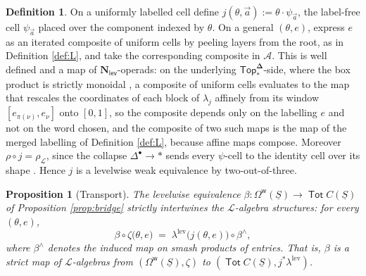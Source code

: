 \documentclass[12pt]{amsart}
\newtheorem{proposition}[subsection]{Proposition}
\theoremstyle{definition}
\newtheorem{definition}[subsection]{Definition}
\theoremstyle{remark}
\newcommand{\Top}{\mathsf{Top}_*}
\newcommand{\Tot}{\operatorname{\mathsf{Tot}}}
\newcommand{\Nl}{\mathbf{N}_{\mathsf{lev}}}
\newcommand{\bdel}{\mathbf{\Delta}}
\newcommand{\uS}{\underline{S}}
\newcommand{\Omw}{\Omega^{\mathsf{w}}}           %
\newcommand{\Lop}{\mathcal{L}}                   %
\newcommand{\Aop}{\mathcal{A}}                   %
\begin{document}
\begin{definition}\label{def:j}
On a uniformly labelled cell define $j(\theta, \vec a) := \theta\cdot \psi_{\vec a}$, the label-free cell $\psi_{\vec a}$ placed over the component indexed by $\theta$. On a general $(\theta, e)$, express $e$ as an iterated composite of uniform cells by peeling layers from the root, as in Definition \ref{def:L}, and take the corresponding composite in $\Aop$. This is well defined and a map of $\Nl$-operads: on the underlying $\Top^{\bdel}$-side, where the box product is strictly monoidal \cite[\S 7]{Clark-1}, a composite of uniform cells evaluates to the map that rescales the coordinates of each block of $\lambda_j$ affinely from its window $[e_{\pi(\nu)}, e_\nu]$ onto $[0,1]$, so the composite depends only on the labelling $e$ and not on the word chosen, and the composite of two such maps is the map of the merged labelling of Definition \ref{def:L}, because affine maps compose. Moreover $\rho\circ j = \rho_{\Lop}$, since the collapse $\Delta^\bullet\to \ast$ sends every $\psi$-cell to the identity cell over its shape \cite[Proposition 7.16]{Clark-1}. Hence $j$ is a levelwise weak equivalence by two-out-of-three.
\end{definition}

\begin{proposition}[Transport]\label{prop:transport}
The levelwise equivalence $\beta\colon \Omw(\uS)\to \Tot C(\uS)$ of Proposition \ref{prop:bridge} strictly intertwines the $\Lop$-algebra structures: for every $(\theta, e)$,
\[ \beta\circ \zeta\big(\theta, e\big) \;=\; \lambda^{\mathrm{lev}}\big(j(\theta, e)\big)\circ \beta^{\wedge},\]
where $\beta^{\wedge}$ denotes the induced map on smash products of entries. That is, $\beta$ is a strict map of $\Lop$-algebras from $(\Omw(\uS), \zeta)$ to $(\Tot C(\uS), j^{*}\lambda^{\mathrm{lev}})$.
\end{proposition}
\end{document}
